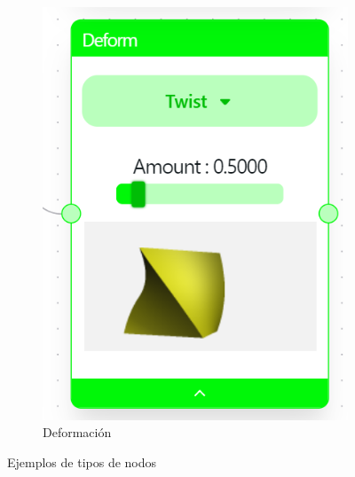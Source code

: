 \begin{figure}[!h]
\begin{subfigure}[b]{0.21\textwidth}
        \includegraphics[width=\textwidth]{Plantilla-TFG-master/img/nodo_def.png}
        \caption{Deformación}
    \end{subfigure}
    \hfill
    \caption{Ejemplos de tipos de nodos}
\end{figure}

